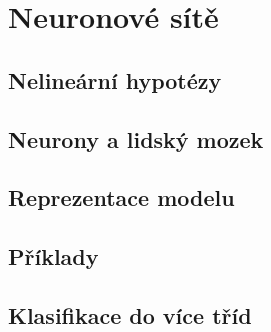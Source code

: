 
\chapter{Neuronové sítě}

\section{Nelineární hypotézy}
\section{Neurony a lidský mozek}
\section{Reprezentace modelu}
\section{Příklady}
\section{Klasifikace do více tříd}

